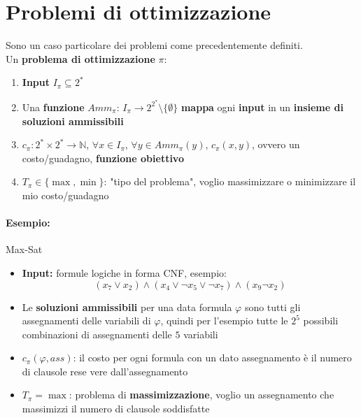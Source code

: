 
\section{Problemi di ottimizzazione}

Sono un caso particolare dei problemi come precedentemente definiti.\\

Un \textbf{problema di ottimizzazione} $\pi$: 
\begin{enumerate}
	\item \textbf{Input} $I_\pi \subseteq 2^\ast$
	
	\item Una \textbf{funzione} $Amm_\pi: \, I_\pi \rightarrow 2^{2^\ast} \setminus \{\emptyset\}$ \textbf{mappa} ogni \textbf{input} in un \textbf{insieme di soluzioni ammissibili}
	
	\item $c_\pi: 2^\ast \times 2^\ast \rightarrow \mathbb{N}$, $\forall x \in I_\pi$, $\forall y \in Amm_\pi (y)$, $c_\pi (x,y)$, ovvero un costo/guadagno, \textbf{funzione obiettivo}
	
	\item $T_\pi \in \{\max, \min\}$: "tipo del problema", voglio massimizzare o minimizzare il mio costo/guadagno
\end{enumerate}

\paragraph{Esempio:} Max-Sat
\begin{itemize}
	\item \textbf{Input:} formule logiche in forma CNF, esempio:
	$$ (x_7 \vee x_2) \wedge (x_4 \vee \neg x_5 \vee \neg x_7) \wedge (x_9 \neg x_2) $$
	
	\item Le \textbf{soluzioni ammissibili} per una data formula $\varphi$ sono tutti gli assegnamenti delle variabili di $\varphi$, quindi per l'esempio tutte le $2^5$ possibili combinazioni di assegnamenti delle $5$ variabili
	
	\item $c_\pi (\varphi, ass)$: il costo per ogni formula con un dato assegnamento è il numero di clausole rese vere dall'assegnamento
	
	\item $T_\pi = \max$: problema di \textbf{massimizzazione}, voglio un assegnamento che massimizzi il numero di clausole soddisfatte
\end{itemize}

